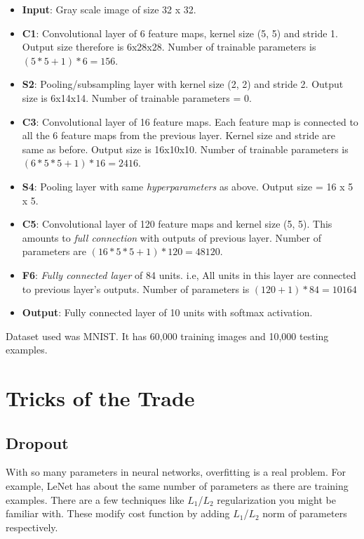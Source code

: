 \documentclass[a4paper]{tufte-handout}
\begin{document}
\begin{itemize}
\item
  \textbf{Input}: Gray scale image of size 32 x 32.
\item
  \textbf{C1}: Convolutional layer of 6 feature maps, kernel size (5, 5)
  and stride 1. Output size therefore is 6x28x28. Number of
  trainable parameters is \((5*5 + 1) * 6 = 156\).
\item
  \textbf{S2}: Pooling/subsampling layer with kernel size (2, 2) and
  stride 2. Output size is 6x14x14. Number of trainable parameters =
  0.
\item
  \textbf{C3}: Convolutional layer of 16 feature maps. Each feature map
  is connected to all the 6 feature maps from the previous layer. Kernel
  size and stride are same as before. Output size is 16x10x10.
  Number of trainable parameters is \((6 * 5 * 5 + 1) * 16 = 2416\).
\item
  \textbf{S4}: Pooling layer with same \emph{hyperparameters} as above.
  Output size = 16 x 5 x 5.
\item
  \textbf{C5}: Convolutional layer of 120 feature maps and kernel size
  (5, 5). This amounts to \emph{full connection} with outputs of
  previous layer. Number of parameters are
  \((16 * 5 * 5 + 1)*120 = 48120\).
\item
  \textbf{F6}: \emph{Fully connected layer} of 84 units. i.e, All units
  in this layer are connected to previous layer's
  outputs. Number of parameters is \((120 + 1)*84 = 10164\)
\item
  \textbf{Output}: Fully connected layer of 10 units with softmax
  activation.
\end{itemize}

Dataset used was MNIST. It has 60,000 training images and 10,000 testing
examples.

\section{Tricks of the Trade}\label{tricks-of-the-trade}

\subsection{Dropout}\label{dropout}

With so many parameters in neural networks, overfitting is a real
problem. For example, LeNet has about the same number of parameters as
there are training examples. There are a few techniques like
\(L_1\)/\(L_2\) regularization you might be familiar with. These modify
cost function by adding \(L_1\)/\(L_2\) norm of parameters respectively.
\end{document}

